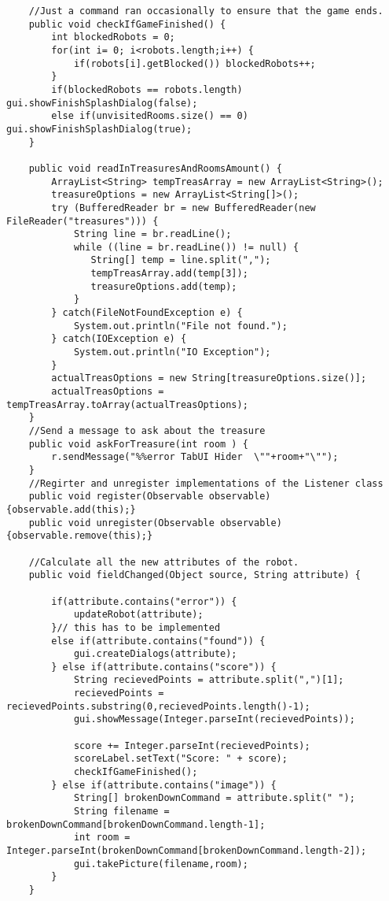 \begin{lstlisting}
	//Just a command ran occasionally to ensure that the game ends.
	public void checkIfGameFinished() {
		int blockedRobots = 0;
		for(int i= 0; i<robots.length;i++) {
			if(robots[i].getBlocked()) blockedRobots++;
		}
		if(blockedRobots == robots.length) gui.showFinishSplashDialog(false);
		else if(unvisitedRooms.size() == 0) gui.showFinishSplashDialog(true);
	}

	public void readInTreasuresAndRoomsAmount() {
		ArrayList<String> tempTreasArray = new ArrayList<String>();
		treasureOptions = new ArrayList<String[]>();
		try (BufferedReader br = new BufferedReader(new FileReader("treasures"))) {
		    String line = br.readLine();
		    while ((line = br.readLine()) != null) {
		       String[] temp = line.split(",");
		       tempTreasArray.add(temp[3]);
		       treasureOptions.add(temp);
		    }
		} catch(FileNotFoundException e) {
			System.out.println("File not found.");
		} catch(IOException e) {
			System.out.println("IO Exception");
		}
		actualTreasOptions = new String[treasureOptions.size()];
		actualTreasOptions = tempTreasArray.toArray(actualTreasOptions);
	}
	//Send a message to ask about the treasure
	public void askForTreasure(int room ) {
		r.sendMessage("%%error TabUI Hider  \""+room+"\"");
	}
	//Regirter and unregister implementations of the Listener class
	public void register(Observable observable) {observable.add(this);}
  	public void unregister(Observable observable) {observable.remove(this);}

  	//Calculate all the new attributes of the robot.
  	public void fieldChanged(Object source, String attribute) {

    	if(attribute.contains("error")) {
    		updateRobot(attribute);
    	}// this has to be implemented
    	else if(attribute.contains("found")) {
    		gui.createDialogs(attribute);
    	} else if(attribute.contains("score")) {
    		String recievedPoints = attribute.split(",")[1];
    		recievedPoints = recievedPoints.substring(0,recievedPoints.length()-1);
    		gui.showMessage(Integer.parseInt(recievedPoints));
    		
    		score += Integer.parseInt(recievedPoints);
    		scoreLabel.setText("Score: " + score);
    		checkIfGameFinished();
    	} else if(attribute.contains("image")) {
    		String[] brokenDownCommand = attribute.split(" ");
    		String filename = brokenDownCommand[brokenDownCommand.length-1];
    		int room = Integer.parseInt(brokenDownCommand[brokenDownCommand.length-2]);
    		gui.takePicture(filename,room);
    	}
  	}


\end{lstlisting}
